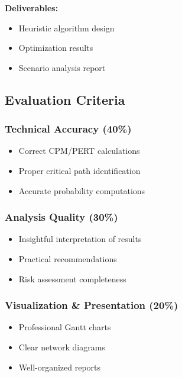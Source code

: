 \documentclass[
  letterpaper,
  DIV=11,
  numbers=noendperiod]{scrreprt}
\providecommand{\tightlist}{%
  \setlength{\itemsep}{0pt}\setlength{\parskip}{0pt}}
\begin{document}
\textbf{Deliverables:}

\begin{itemize}
\tightlist
\item
  Heuristic algorithm design
\item
  Optimization results
\item
  Scenario analysis report
\end{itemize}

\subsection{Evaluation Criteria}\label{evaluation-criteria}

\subsubsection{Technical Accuracy (40\%)}\label{technical-accuracy-40}

\begin{itemize}
\tightlist
\item
  Correct CPM/PERT calculations
\item
  Proper critical path identification
\item
  Accurate probability computations
\end{itemize}

\subsubsection{Analysis Quality (30\%)}\label{analysis-quality-30}

\begin{itemize}
\tightlist
\item
  Insightful interpretation of results
\item
  Practical recommendations
\item
  Risk assessment completeness
\end{itemize}

\subsubsection{Visualization \& Presentation
(20\%)}\label{visualization-presentation-20}

\begin{itemize}
\tightlist
\item
  Professional Gantt charts
\item
  Clear network diagrams
\item
  Well-organized reports
\end{itemize}
\end{document}
